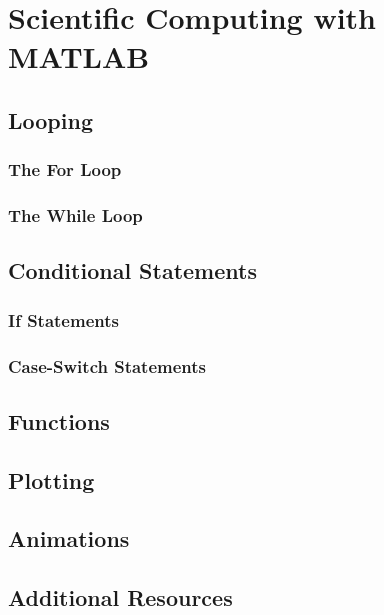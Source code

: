 \chapter{Scientific Computing with MATLAB}

\section{Looping}
\subsection{The For Loop}

\subsection{The While Loop}


\section{Conditional Statements}
\subsection{If Statements}

\subsection{Case-Switch Statements}

\section{Functions}


\section{Plotting}


\section{Animations}




\section{Additional Resources}


